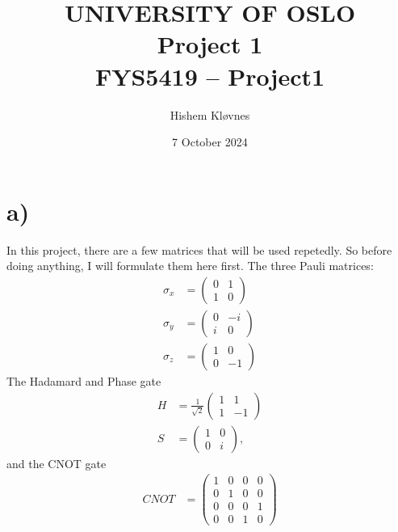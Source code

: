 \documentclass[11pt, letterpaper, titlepage]{article}
\title{
 \textbf{\LARGE UNIVERSITY OF OSLO} \\
\vspace{37mm}
\textbf{\Large Project 1}\\
\vspace{7mm}
\Large FYS5419 – Project1
\vspace{25mm}
}
\author{\Large Hishem Kløvnes }
\date{\Large 7 October 2024} %
\begin{document}
\maketitle
\newpage




\section{a)}
In this project, there are a few matrices that will be used repetedly. So before doing anything, I will formulate them here first. 
The three Pauli matrices: 
\[
\begin{aligned}
σ_x &= \begin{pmatrix}  
        0 & 1 \\
        1 & 0
\end{pmatrix}\\
σ_y &= \begin{pmatrix}
        0 &-i\\
        i & 0
\end{pmatrix}\\
σ_z  &= \begin{pmatrix}
      1 & 0\\
      0 &-1  
\end{pmatrix}
\end{aligned}
\] 
The Hadamard and Phase gate
\[
\begin{aligned}
        H &= \frac{1}{\sqrt{2}} \begin{pmatrix}
                1&1\\1&-1
        \end{pmatrix}\\
        S &= \begin{pmatrix}
                1&0\\0&i
        \end{pmatrix},
\end{aligned}
\]
and the CNOT gate
\[
\begin{aligned}
        CNOT &= \begin{pmatrix}
                1&0&0&0\\
                0&1&0&0\\
                0&0&0&1\\
                0&0&1&0
        \end{pmatrix}
\end{aligned}
\]
\end{document}
